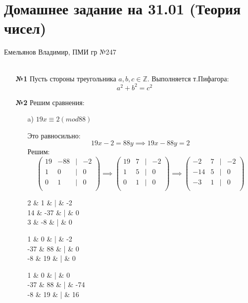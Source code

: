 \documentclass[a4paper]{article}
\newcommand{\mat}[1]{\begin{pmatrix} #1 \end{pmatrix}}
\newcommand{\ZZ}{\mathbb{Z}}
\begin{document}
\section*{Домашнее задание на 31.01 (Теория чисел)}
 {\large Емельянов Владимир, ПМИ гр №247}\\\\
\begin{enumerate}
    \item[\textbf{№1}]Пусть стороны треугольника $a, b, c \in \ZZ$. Выполняется т.Пифагора:
    $$a^2 + b^2 = c^2$$

    \item[\textbf{№2}]Решим сравнения:
    \begin{enumerate}
        \item[a)] $19x \equiv 2 (mod 88)$
        
        Это равносильно:
        $$19x-2 = 88y \implies 19x-88y=2$$
        Решим:
        $$\mat{
            19 & -88 & | & -2 \\
            1 & 0 & | & 0 \\
            0 & 1 & | & 0 \\

        } \implies\mat{
            19 & 7 & | & -2 \\
            1 & 5 & | & 0 \\
            0 & 1 & | & 0 \\

        } \implies \mat{
            -2 & 7 & | & -2 \\
            -14 & 5 & | & 0 \\
            -3 & 1 & | & 0 \\

        }$$$$\implies \mat{
            2 & 1 & | & -2 \\
            14 & -37 & | & 0 \\
            3 & -8 & | & 0 \\

        }\implies \mat{
            1 & 0 & | & -2 \\
            -37 & 88 & | & 0 \\
            -8 & 19 & | & 0 \\

        }\implies \mat{
            1 & 0 & | & 0 \\
            -37 & 88 & | & -74 \\
            -8 & 19 & | & 16 \\

}
\end{enumerate}
\end{enumerate}
\end{document}
